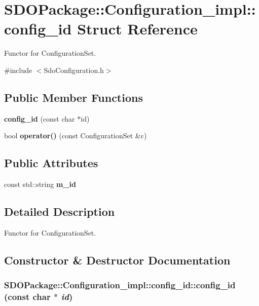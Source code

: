 \section{SDOPackage::Configuration\_\-impl::config\_\-id Struct Reference}
\label{structSDOPackage_1_1Configuration__impl_1_1config__id}


Functor for ConfigurationSet.  




{\ttfamily \#include $<$SdoConfiguration.h$>$}

\subsection*{Public Member Functions}
\begin{DoxyCompactItemize}
\item 
{\bf config\_\-id} (const char $\ast$id)
\item 
bool {\bf operator()} (const ConfigurationSet \&c)
\end{DoxyCompactItemize}
\subsection*{Public Attributes}
\begin{DoxyCompactItemize}
\item 
const std::string {\bf m\_\-id}
\end{DoxyCompactItemize}


\subsection{Detailed Description}
Functor for ConfigurationSet. 

\subsection{Constructor \& Destructor Documentation}
\subsubsection[{config\_\-id}]{\setlength{\rightskip}{0pt plus 5cm}SDOPackage::Configuration\_\-impl::config\_\-id::config\_\-id (const char $\ast$ {\em id})\hspace{0.3cm}{\ttfamily  [inline]}}\label{structSDOPackage_1_1Configuration__impl_1_1config__id_a5a00969e9d9c016597921bdab51db000}


